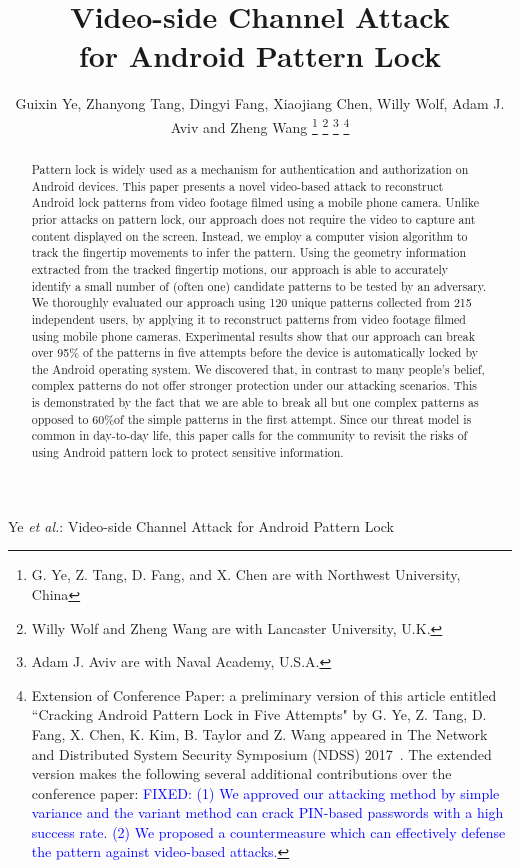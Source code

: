 \documentclass[journal]{IEEEtran}
\newcommand\FIXED[1]{\textcolor{blue}{FIXED: }\textcolor{blue}{#1}}
\begin{document}
\title{Video-side Channel Attack \\ for Android Pattern Lock}


\author{Guixin Ye, Zhanyong Tang, Dingyi Fang, Xiaojiang Chen,
        Willy Wolf, Adam J. Aviv and Zheng Wang
\thanks{G. Ye, Z. Tang, D. Fang, and X. Chen are with Northwest University, China}%
\thanks{Willy Wolf and Zheng Wang are with Lancaster University, U.K.}
\thanks{Adam J. Aviv are with Naval Academy, U.S.A.}
\thanks{
Extension of Conference Paper: a preliminary version of this article entitled ``Cracking Android Pattern Lock
in Five Attempts" by G. Ye, Z. Tang, D. Fang, X. Chen, K. Kim, B. Taylor and Z. Wang appeared in
The Network and Distributed System Security Symposium (NDSS) 2017~\cite{ye2017cracking}.
The extended version makes the following several additional contributions over the conference
paper: \FIXED{(1) We approved our attacking method by simple variance and the variant method can crack PIN-based passwords with a high success rate. (2) We proposed a countermeasure which can effectively defense the pattern against video-based attacks.}
}
}


%
{Ye \MakeLowercase{\textit{et al.}}: Video-side Channel Attack for Android Pattern Lock}

\maketitle

\begin{abstract}
    Pattern lock is widely used as a mechanism for authentication and authorization on Android devices. This paper presents a novel video-based attack to reconstruct Android lock patterns from video footage filmed using a mobile phone camera. Unlike prior attacks on pattern lock, our approach does not require the video to capture ant content displayed on the screen. Instead, we employ a computer vision algorithm to track the fingertip movements to infer the pattern. Using the geometry information extracted from the tracked fingertip motions, our approach is able to accurately identify a small number of (often one) candidate patterns to be tested by an adversary. We thoroughly evaluated our approach using 120 unique patterns collected from 215 independent users, by applying it to reconstruct patterns from video footage filmed using mobile phone cameras. Experimental results show that our approach can break over 95\% of the patterns in five attempts before the device is automatically locked by the Android operating system. We discovered that, in contrast to many people's belief, complex patterns do not offer stronger protection under our attacking scenarios. This is demonstrated by the fact that we are able to break all but one complex patterns as opposed to 60\%of the simple patterns in the first attempt. Since our threat model is common in day-to-day life, this paper calls for the community to revisit the risks of using Android pattern lock to protect sensitive information.
\end{abstract}
\end{document}
